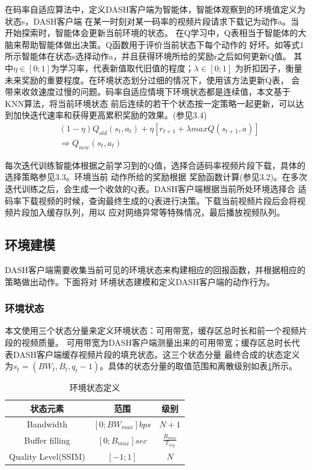 \documentclass[twocolumn]{article}
\renewcommand\arraystretch{1.2}
\begin{document}
在码率自适应算法中，定义DASH客户端为智能体，智能体观察到的环境值定义为状态s，DASH客户端
在某一时刻对某一码率的视频片段请求下载记为动作a。当开始探索时，智能体会更新当前环境的状态。
在Q学习中，Q表相当于智能体的大脑来帮助智能体做出决策。Q函数用于评价当前状态下每个动作的
好坏。如等式1所示智能体在状态s选择动作a，并且获得环境所给的奖励r之后如何更新Q值。
其中$\eta\in\left[0;1\right]$为学习率，代表新值取代旧值的程度；$\lambda\in\left[0;1\right]$
为折扣因子，衡量未来奖励的重要程度。在环境状态划分过细的情况下，使用该方法更新Q表，
会带来收敛速度过慢的问题。码率自适应情境下环境状态都是连续值，本文基于KNN算法，将当前环境状态
前后连续的若干个状态按一定策略一起更新，可以达到加快迭代速率和获得更高累积奖励的效果。(参见3.4)
\begin{equation}
\begin{aligned}
 &\left(1-\eta\right)Q_{old}\left(s_t,a_t\right)+\eta\left[r_{t+1}+\lambda max Q\left(s_{t+1},a\right)\right]\\    
 &\Rightarrow Q_{new}\left(s_t,a_t\right)
\end{aligned}
\end{equation}

每次迭代训练智能体根据之前学习到的Q值，选择合适码率视频片段下载，具体的选择策略参见3.3。环境当前
动作所给的奖励根据
奖励函数计算(参见3.2)。在多次迭代训练之后，会生成一个收敛的Q表。DASH客户端根据当前所处环境选择合
适码率下载视频的时候，查询最终生成的Q表进行决策。下载当前视频片段后会将视频片段加入缓存队列，用以
应对网络异常等特殊情况，最后播放视频队列。

\subsection{环境建模}
DASH客户端需要收集当前可见的环境状态来构建相应的回报函数，并根据相应的策略做出动作。下面将对
环境状态建模和定义DASH客户端的动作行为。
\subsubsection{环境状态}
本文使用三个状态分量来定义环境状态：可用带宽，缓存区总时长和前一个视频片段的视频质量。
可用带宽为DASH客户端测量出来的可用带宽；缓存区总时长代表DASH客户端缓存视频片段的填充状态。这三个状态分量
最终合成的状态定义为$s_t=(BW_t,B_t,q_t-1)$。具体的状态分量的取值范围和离散级别如表\ref{environment state}所示。
\begin{table}[h]
\centering
\renewcommand\arraystretch{0.8}
\caption{环境状态定义}
\label{environment state}
\begin{tabular}{ccc}
\toprule
状态元素& 范围& 级别\\
\midrule
Bandwidth& $\left[0;BW_{max}\right]bps$& $N+1$\\
Buffer filling& $\left[0;B_{max}\right]sec$& $\frac{B_{max}}{T_{seg}}$\\
Quality Level(SSIM)&$\left[-1;1\right]$&$N$\\
\bottomrule
\end{tabular}
\end{table}
\end{document}
